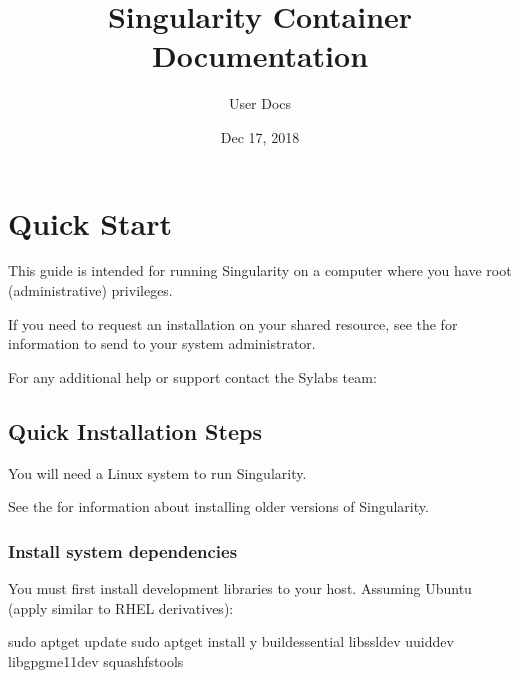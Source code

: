 \documentclass[letterpaper,10pt,english]{sphinxmanual}
\title{Singularity Container Documentation}
\date{Dec 17, 2018}
\author{User Docs}
\begin{document}
\maketitle
\sphinxtableofcontents
{}\label{\detokenize{index::doc}}



\chapter{Quick Start}
\label{\detokenize{quick_start:quick-start}}\label{\detokenize{quick_start:id1}}\label{\detokenize{quick_start::doc}}\label{\detokenize{quick_start:sec-quickstart}}
This guide is intended for running Singularity on a computer where you
have root (administrative) privileges.

If you need to request an installation on your shared resource, see the
 for
information to send to your system administrator.

For any additional help or support contact the Sylabs team:


\section{Quick Installation Steps}
\label{\detokenize{quick_start:quick-installation-steps}}\label{\detokenize{quick_start:quick-installation}}
You will need a Linux system to run Singularity.

See the {\hyperref[\detokenize{installation:installation}]{}} for information about installing
older versions of Singularity.


\subsection{Install system dependencies}
\label{\detokenize{quick_start:install-system-dependencies}}
You must first install development libraries to your host. Assuming Ubuntu
(apply similar to RHEL derivatives):

%
\begin{sphinxVerbatim}[commandchars=\\\{\}]
\PYGZdl{} sudo apt\PYGZhy{}get update \PYGZam{}\PYGZam{} sudo apt\PYGZhy{}get install \PYGZhy{}y \PYGZbs{}
    build\PYGZhy{}essential \PYGZbs{}
    libssl\PYGZhy{}dev \PYGZbs{}
    uuid\PYGZhy{}dev \PYGZbs{}
    libgpgme11\PYGZhy{}dev \PYGZbs{}
    squashfs\PYGZhy{}tools
\end{sphinxVerbatim}
\end{document}
